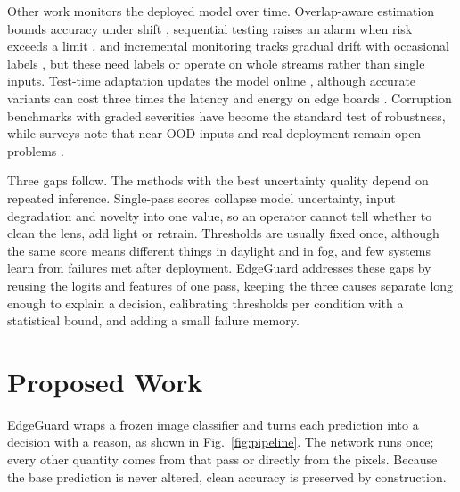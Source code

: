 \documentclass[conference]{IEEEtran}
\begin{document}
Other work monitors the deployed model over time. Overlap-aware estimation bounds accuracy under shift \cite{mishra2025odd}, sequential testing raises an alarm when risk exceeds a limit \cite{timans2025monitoring}, and incremental monitoring tracks gradual drift with occasional labels \cite{koebler2025incremental}, but these need labels or operate on whole streams rather than single inputs. Test-time adaptation updates the model online \cite{ma2026embodi,hu2025duo}, although accurate variants can cost three times the latency and energy on edge boards \cite{danilowski2026botta}. Corruption benchmarks with graded severities \cite{hendrycks2019corruptions} have become the standard test of robustness, while surveys note that near-OOD inputs and real deployment remain open problems \cite{lu2024oodsurvey}.

Three gaps follow. The methods with the best uncertainty quality depend on repeated inference. Single-pass scores collapse model uncertainty, input degradation and novelty into one value, so an operator cannot tell whether to clean the lens, add light or retrain. Thresholds are usually fixed once, although the same score means different things in daylight and in fog, and few systems learn from failures met after deployment. EdgeGuard addresses these gaps by reusing the logits and features of one pass, keeping the three causes separate long enough to explain a decision, calibrating thresholds per condition with a statistical bound, and adding a small failure memory.

\section{Proposed Work}
\label{sec:method}

EdgeGuard wraps a frozen image classifier and turns each prediction into a decision with a reason, as shown in Fig.~\ref{fig:pipeline}. The network runs once; every other quantity comes from that pass or directly from the pixels. Because the base prediction is never altered, clean accuracy is preserved by construction.
\end{document}
